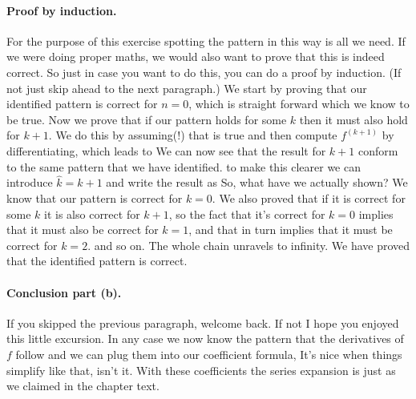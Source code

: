 \paragraph{Proof by induction.}For the purpose of this exercise spotting the pattern in this way is all we need. If we were doing proper maths, we would also want to prove that this is indeed correct. So just in case you want to do this, you can do a proof by induction. (If not just skip ahead to the next paragraph.) We start by proving that our identified pattern is correct for $n=0$, which is straight forward
which we know to be true. Now we prove that if our pattern holds for some $k$ then it must also hold for $k+1$. We do this by assuming(!) that 
is true and then compute $f^{(k+1)}$ by differentiating, which leads to 
We can now see that the result for $k+1$ conform to the same pattern that we have identified. to make this clearer we can introduce $\hat{k}=k+1$ and write the result as 
So, what have we actually shown? We know that our pattern is correct for $k=0$. We also proved that if it is correct for some $k$ it is also correct for $k+1$, so the fact that it's correct for $k=0$ implies that it must also be correct for $k=1$, and that in turn implies that it must be correct for $k=2$. and so on. The whole chain unravels to infinity. We have proved that the identified pattern is correct. 

\paragraph{Conclusion part (b).}If you skipped the previous paragraph, welcome back. If not I hope you enjoyed this little excursion. In any case we now know the pattern that the derivatives of $f$ follow and we can plug them into our coefficient formula,
It's nice when things simplify like that, isn't it. With these coefficients the series expansion is just 
as we claimed in the chapter text.

